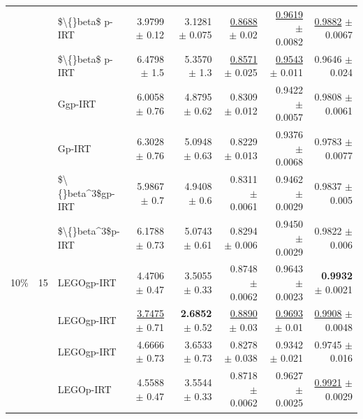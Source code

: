 \begin{longtable}{llp{}rrrrr}
 &  & \$\textbackslash\{\}beta\$ p-IRT & 3.9799 {\scriptsize $\pm$ 0.12} & 3.1281 {\scriptsize $\pm$ 0.075} & \underline{0.8688} {\scriptsize $\pm$ 0.02} & \underline{0.9619} {\scriptsize $\pm$ 0.0082} & \underline{0.9882} {\scriptsize $\pm$ 0.0067} \\
 &  & \$\textbackslash\{\}beta\$ p-IRT & 6.4798 {\scriptsize $\pm$ 1.5} & 5.3570 {\scriptsize $\pm$ 1.3} & \underline{0.8571} {\scriptsize $\pm$ 0.025} & \underline{0.9543} {\scriptsize $\pm$ 0.011} & 0.9646 {\scriptsize $\pm$ 0.024} \\
 &  & Ggp-IRT & 6.0058 {\scriptsize $\pm$ 0.76} & 4.8795 {\scriptsize $\pm$ 0.62} & 0.8309 {\scriptsize $\pm$ 0.012} & 0.9422 {\scriptsize $\pm$ 0.0057} & 0.9808 {\scriptsize $\pm$ 0.0061} \\
 &  & Gp-IRT & 6.3028 {\scriptsize $\pm$ 0.76} & 5.0948 {\scriptsize $\pm$ 0.63} & 0.8229 {\scriptsize $\pm$ 0.013} & 0.9376 {\scriptsize $\pm$ 0.0068} & 0.9783 {\scriptsize $\pm$ 0.0077} \\
 &  & \$\textbackslash\{\}beta\textasciicircum{}3\$gp-IRT & 5.9867 {\scriptsize $\pm$ 0.7} & 4.9408 {\scriptsize $\pm$ 0.6} & 0.8311 {\scriptsize $\pm$ 0.0061} & 0.9462 {\scriptsize $\pm$ 0.0029} & 0.9837 {\scriptsize $\pm$ 0.005} \\
 &  & \$\textbackslash\{\}beta\textasciicircum{}3\$p-IRT & 6.1788 {\scriptsize $\pm$ 0.73} & 5.0743 {\scriptsize $\pm$ 0.61} & 0.8294 {\scriptsize $\pm$ 0.006} & 0.9450 {\scriptsize $\pm$ 0.0029} & 0.9822 {\scriptsize $\pm$ 0.006} \\
\midrule
10\% & 15 & LEGOgp-IRT & 4.4706 {\scriptsize $\pm$ 0.47} & 3.5055 {\scriptsize $\pm$ 0.33} & 0.8748 {\scriptsize $\pm$ 0.0062} & 0.9643 {\scriptsize $\pm$ 0.0023} & \textbf{0.9932} {\scriptsize $\pm$ 0.0021} \\
 &  & LEGOgp-IRT & \underline{3.7475} {\scriptsize $\pm$ 0.71} & \textbf{2.6852} {\scriptsize $\pm$ 0.52} & \underline{0.8890} {\scriptsize $\pm$ 0.03} & \underline{0.9693} {\scriptsize $\pm$ 0.01} & \underline{0.9908} {\scriptsize $\pm$ 0.0048} \\
 &  & LEGOgp-IRT & 4.6666 {\scriptsize $\pm$ 0.73} & 3.6533 {\scriptsize $\pm$ 0.73} & 0.8278 {\scriptsize $\pm$ 0.038} & 0.9342 {\scriptsize $\pm$ 0.021} & 0.9745 {\scriptsize $\pm$ 0.016} \\
 &  & LEGOp-IRT & 4.5588 {\scriptsize $\pm$ 0.47} & 3.5544 {\scriptsize $\pm$ 0.33} & 0.8718 {\scriptsize $\pm$ 0.0062} & 0.9627 {\scriptsize $\pm$ 0.0025} & \underline{0.9921} {\scriptsize $\pm$ 0.0029} \\

\end{longtable}
